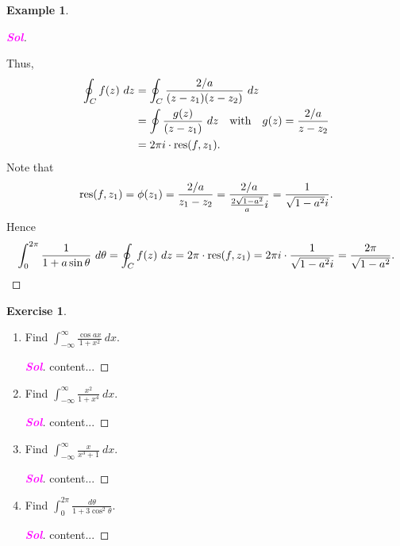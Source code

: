 \documentclass[12pt,openany]{book}
\theoremstyle{definition}
\newtheorem{exercise}{Exercise}[section]
\newtheorem{example}{Example}[section]
\newcommand{\sol}{\textcolor{magenta}{\bf Sol}}
\newcommand{\res}{\textnormal{res}}
\begin{document}
\begin{example}
\begin{proof}[\sol]
\begin{center}
		\end{center}
		Thus, \begin{align*}
			\oint_C f(z)\ dz&=\oint_C\frac{2/a}{(z-z_1)(z-z_2)}\ dz\\
			&=\oint\frac{g(z)}{(z-z_1)}\ dz\quad\text{with}\quad g(z)=\frac{2/a}{z-z_2}\\
			&=2\pi i\cdot \res(f,z_1).
		\end{align*} Note that \[
		\res(f,z_1)=\phi(z_1)=\frac{2/a}{z_1-z_2}=\frac{2/a}{\frac{2\sqrt{1-a^2}}{a}i}=\frac{1}{\sqrt{1-a^2}i}.
		\] Hence \[
		\int_0^{2\pi}\frac{1}{1+a\sin\theta}\ d\theta=\oint_C f(z)\ dz= 2\pi\cdot\res(f,z_1)=2\pi i\cdot\frac{1}{\sqrt{1-a^2}i}=\frac{2\pi}{\sqrt{1-a^2}}.
		\]
		\end{proof}
	\end{example}
	
	\newpage
	\begin{exercise}
		\ \begin{enumerate}
			\item Find $\displaystyle\int_{-\infty}^{\infty}\frac{\cos ax}{1+x^2}\ dx$.
			\begin{proof}[\sol]
				content...
			\end{proof}
			\vspace{8pt}
			\item Find $\displaystyle\int_{-\infty}^{\infty}\frac{x^2}{1+x^4}\ dx$.
			\begin{proof}[\sol]
				content...
			\end{proof}
			\vspace{8pt}
			\item Find $\displaystyle\int_{-\infty}^{\infty}\frac{x}{x^3+1}\ dx$.
			\begin{proof}[\sol]
				content...
			\end{proof}
			\vspace{8pt}
			\item Find $\displaystyle\int_{0}^{2\pi}\frac{d\theta}{1+3\cos^2\theta}$.
			\begin{proof}[\sol]
				content...
			\end{proof}
		\end{enumerate}
	\end{exercise}
	
	\newpage
	\begin{tcolorbox}[colback=white,colframe=defcolor,arc=5pt,title={\color{white}\bf }]
		
	\end{tcolorbox}
\end{document}
